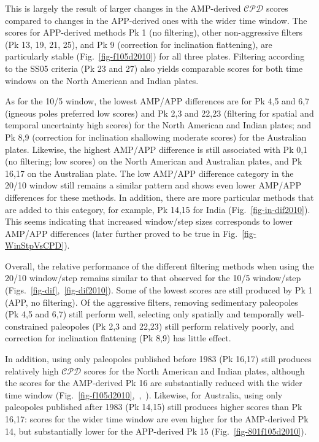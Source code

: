 This is largely the result of larger changes in the AMP-derived $\mathcal{CPD}$
scores compared to changes in the APP-derived ones with the wider time window.
The scores for APP-derived methods Pk 1 (no filtering), other non-aggressive
filters (Pk 13, 19, 21, 25), and Pk 9 (correction for inclination flattening),
are particularly stable (Fig.~\ref{fig-f105d2010}) for all three plates.
Filtering according to the SS05 criteria (Pk 23 and 27) also yields comparable
scores for both time windows on the North American and Indian plates.

As for the 10/5 window, the lowest AMP/APP differences are for Pk 4,5 and 6,7
(igneous poles preferred \textendash{} low scores) and Pk 2,3 and 22,23
(filtering for spatial and temporal uncertainty \textendash{} high scores) for
the North American and Indian plates; and Pk 8,9 (correction for inclination
shallowing \textendash{} moderate scores) for the Australian plates. Likewise,
the highest AMP/APP difference is still associated with Pk 0,1 (no filtering;
low scores) on the North American and Australian plates, and Pk 16,17 on the
Australian plate. The low AMP/APP difference category in the 20/10 window still
remains a similar pattern and shows even lower AMP/APP differences for these
methods. In addition, there are more particular methods that are added to this
category, for example, Pk 14,15 for India (Fig.~\ref{fig-in-dif2010}). This
seems indicating that increased window/step sizes corresponds to lower AMP/APP
differences (later further proved to be true in Fig.~\ref{fig-WinStpVsCPD}).

Overall, the relative performance of the different filtering methods when using
the 20/10 window/step remains similar to that observed for the 10/5 window/step
(Figs.~\ref{fig-dif},~\ref{fig-dif2010}). Some of the lowest scores are still
produced by Pk 1 (APP, no filtering). Of the aggressive filters, removing
sedimentary paleopoles (Pk 4,5 and 6,7) still perform well, selecting only
spatially and temporally well-constrained paleopoles (Pk 2,3 and 22,23) still
perform relatively poorly, and correction for inclination flattening (Pk 8,9)
has little effect.

In addition, using only paleopoles published before 1983 (Pk 16,17) still
produces relatively high $\mathcal{CPD}$ scores for the North American and
Indian plates, although the scores for the AMP-derived Pk 16 are substantially
reduced with the wider time window
(Fig.~\ref{fig-f105d2010},~,~).
Likewise, for Australia, using only paleopoles published after 1983 (Pk 14,15)
still produces higher scores than Pk 16,17: scores for the wider time window are
even higher for the AMP-derived Pk 14, but substantially lower for the
APP-derived Pk 15 (Fig.~\ref{fig-801f105d2010}).

